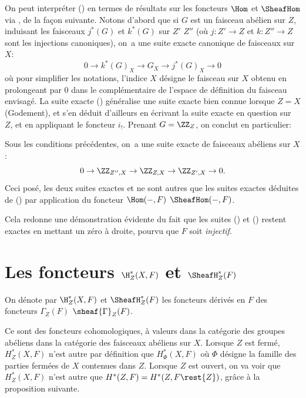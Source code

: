 On peut interpr\'eter () en termes de r\'esultats sur les
foncteurs $\Hom$ et $\SheafHom$ via , de la fa\c con
suivante. Notons d'abord que si $G$ est un faisceau ab\'elien sur
$Z$, induisant les faisceaux $j^*(G)$ et $k^*(G)$ sur $Z'$ \resp
$Z''$ (o\`u $j: Z' \to Z$ et $k: Z'' \to Z$ sont les injections
canoniques), on~a une suite exacte canonique de faisceaux sur $X$:
\begin{equation} \label{eq:I.17} {0 \to k^*(G)_X \to G_X \to j^*(G)_X \to 0}
\end{equation}
o\`u pour simplifier les notations, l'indice $X$ d\'esigne le faisceau sur $X$ obtenu en prolongeant par $0$ dans le compl\'ementaire de l'espace de d\'efinition du faisceau envisag\'e. La suite exacte () g\'en\'eralise une suite exacte bien connue lorsque $Z=X$ (\cf Godement), et s'en d\'eduit d'ailleurs en \'ecrivant la suite exacte en question sur~$Z$, et en appliquant le foncteur $i_!$. Prenant $G=\ZZ_{Z}$, on conclut en particulier:

\begin{proposition} \label{I.1.10}
Sous les conditions pr\'ec\'edentes, on~a une suite exacte de faisceaux ab\'eliens sur $X$:
\begin{equation} \label{eq:I.18} {0 \to \ZZ_{Z{''}, X} \to \ZZ_{Z, X} \to \ZZ_{Z', X} \to 0}.
\end{equation}
Ceci pos\'e, les deux suites exactes  et  ne sont autres que les suites exactes d\'eduites de () par application du foncteur $\Hom(-, F)$ \resp $\SheafHom(-, F)$.
\end{proposition}

Cela redonne une d\'emonstration \'evidente du fait que les suites () et () restent exactes en mettant un z\'ero \`a droite, pourvu que $F$ soit \textit{injectif}.

\section{Les foncteurs $\H_Z^*(X, F)$ et $\SheafH_Z^*(F)$} \label{I.2}
\pageoriginale
\ignorespaces

\begin{definition} \label{I.2.1}
On d\'enote par $\H_Z^*(X, F)$ et ${\SheafH}_Z^*(F)$ les foncteurs d\'eriv\'es en $F$ des foncteurs $\Gamma_Z(F)$ \resp $\sheaf{\Gamma}_Z(F)$.
\end{definition}

Ce sont des foncteurs cohomologiques, \`a valeurs dans la cat\'egorie des groupes ab\'eliens \resp dans la cat\'egorie des faisceaux ab\'eliens sur $X$. Lorsque $Z$ est ferm\'e, $H_Z^*(X, F)$ n'est autre par d\'efinition que $H^*_{\Phi}(X, F)$ o\`u $\Phi$ d\'esigne la famille des parties ferm\'ees de $X$ contenues dans $Z$. Lorsque $Z$ est ouvert, on va voir que $H_Z^*(X, F)$ n'est autre que $H^*(Z, F)=H^*(Z, F\rest{Z})$, gr\^ace \`a la proposition suivante.

